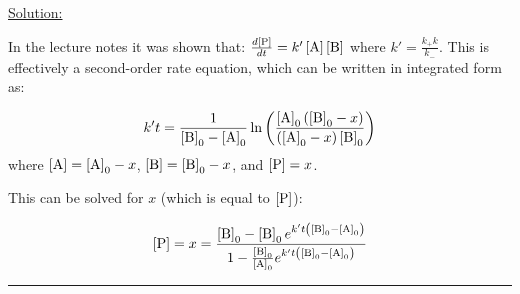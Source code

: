 \noindent
\underline{Solution:}

In the lecture notes it was shown that: $\frac{d\left[\textnormal{P}\right]}{dt} = k'\left[\textnormal{A}\right]\left[\textnormal{B}\right]$
where $k' = \frac{k_+k}{k_-}$. This is effectively a second-order rate equation, which can be written in integrated form as:

$$k't = \frac{1}{\left[\textnormal{B}\right]_0 - \left[\textnormal{A}\right]_0} \ln\left(\frac{\left[\textnormal{A}\right]_0\left(\left[\textnormal{B}\right]_0 - x\right)}{\left(\left[\textnormal{A}\right]_0-x\right)\left[\textnormal{B}\right]_0}\right)$$
where $\left[\textnormal{A}\right] = \left[\textnormal{A}\right]_0 - x$, $\left[\textnormal{B}\right] = \left[\textnormal{B}\right]_0 - x$, and $\left[\textnormal{P}\right] = x$.

\noindent
This can be solved for $x$ (which is equal to $\left[\textnormal{P}\right]$):

$$\left[\textnormal{P}\right] = x = \frac{\left[\textnormal{B}\right]_0 - \left[\textnormal{B}\right]_0e^{k't\left(\left[\textnormal{B}\right]_0 - \left[\textnormal{A}\right]_0\right)}}{1 - \frac{\left[\textnormal{B}\right]_0}{\left[\textnormal{A}\right]_0}e^{k't\left(\left[\textnormal{B}\right]_0 - \left[\textnormal{A}\right]_0\right)}}$$
\hrule\vspace{0.5cm}
